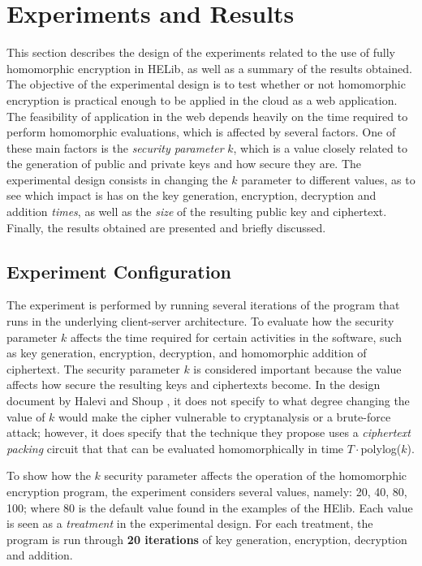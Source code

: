 \chapter{Experiments and Results}
\label{resultados}

This section describes the design of the experiments related to the use of fully homomorphic encryption in HELib, as well as a summary of the results obtained. The objective of the experimental design is to test whether or not homomorphic encryption is practical enough to be applied in the cloud as a web application. The feasibility of application in the web depends heavily on the time required to perform homomorphic evaluations, which is affected by several factors. One of these main factors is the \emph{security parameter} $k$, which is a value closely related to the generation of public and private keys and how secure they are. The experimental design consists in changing the $k$ parameter to different values, as to see which impact is has on the key generation, encryption, decryption and addition  \emph{times}, as well as the \emph{size} of the resulting public key and ciphertext. Finally, the results obtained are presented and briefly discussed. 

\section{Experiment Configuration}

The experiment is performed by running several iterations of the program that runs in the underlying client-server architecture. To evaluate how the security parameter $k$ affects the time required for certain activities in the software, such as key generation, encryption, decryption, and homomorphic addition of ciphertext. The security parameter $k$ is considered important because the value affects how secure the resulting keys and ciphertexts become. In the design document by Halevi and Shoup \cite{cryptoeprint:2014:106}, it does not specify to what degree changing the value of $k$ would make the cipher vulnerable to cryptanalysis or a brute-force attack; however, it does specify that the technique they propose uses a \emph{ciphertext packing} circuit that that can be evaluated homomorphically in time $T \cdot $polylog($k$).

To show how the $k$ security parameter affects the operation of the homomorphic encryption program, the experiment considers several values, namely: 20, 40, 80, 100; where 80 is the default value found in the examples of the HElib. Each value is seen as a \emph{treatment} in the experimental design. For each treatment, the program is run through \textbf{20 iterations} of key generation, encryption, decryption and addition. 

